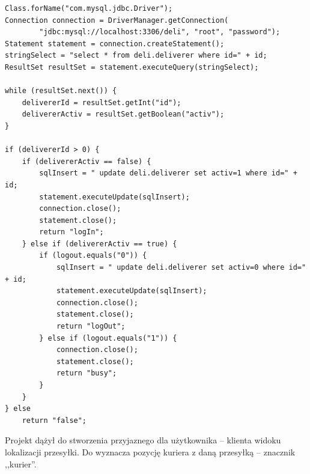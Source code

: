 \documentclass[eng,printmode,oneside]{mgr}
\begin{document}
\begin{lstlisting}[caption=Połączenia z bazą danych na przykładzie metody
sprawdzającej istnienie kuriera oraz jego stan
używanej przez aplikację
mobilną,label=lst:CheckIsExistsDeveliverer.selectFromDB.java]
Class.forName("com.mysql.jdbc.Driver");
Connection connection = DriverManager.getConnection(
		"jdbc:mysql://localhost:3306/deli", "root", "password");
Statement statement = connection.createStatement();
stringSelect = "select * from deli.deliverer where id=" + id;
ResultSet resultSet = statement.executeQuery(stringSelect);

while (resultSet.next()) {
	delivererId = resultSet.getInt("id");
	delivererActiv = resultSet.getBoolean("activ");
} 

if (delivererId > 0) {
	if (delivererActiv == false) {
		sqlInsert = " update deli.deliverer set activ=1 where id=" + id;
		statement.executeUpdate(sqlInsert);
		connection.close();
		statement.close();
		return "logIn";
	} else if (delivererActiv == true) {
		if (logout.equals("0")) {
			sqlInsert = " update deli.deliverer set activ=0 where id=" + id;
			statement.executeUpdate(sqlInsert);
			connection.close();
			statement.close();
			return "logOut";
		} else if (logout.equals("1")) {
			connection.close();
			statement.close();
			return "busy";
		}
	}
} else
	return "false";
\end{lstlisting}

Projekt dążył do stworzenia przyjaznego dla użytkownika
-- klienta widoku lokalizacji przesyłki. Do 
  
 
wyznacza pozycję kuriera z daną przesyłką -- znacznik ,,kurier''.
\end{document}
